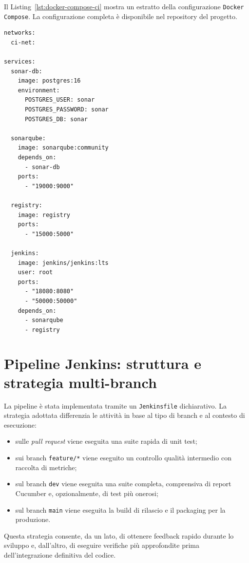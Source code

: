 Il Listing~\ref{lst:docker-compose-ci} mostra un estratto della configurazione \texttt{Docker Compose}. La configurazione completa è disponibile nel repository del progetto.

\captionsetup{type=listing}
\label{lst:docker-compose-ci}
\begin{verbatim}
networks:
  ci-net:

services:
  sonar-db:
    image: postgres:16
    environment:
      POSTGRES_USER: sonar
      POSTGRES_PASSWORD: sonar
      POSTGRES_DB: sonar

  sonarqube:
    image: sonarqube:community
    depends_on:
      - sonar-db
    ports:
      - "19000:9000"

  registry:
    image: registry
    ports:
      - "15000:5000"

  jenkins:
    image: jenkins/jenkins:lts
    user: root
    ports:
      - "18080:8080"
      - "50000:50000"
    depends_on:
      - sonarqube
      - registry
\end{verbatim}

\section{Pipeline Jenkins: struttura e strategia multi-branch}
\label{sec:pipeline-jenkins}

La pipeline è stata implementata tramite un \texttt{Jenkinsfile} dichiarativo. La strategia adottata differenzia le attività in base al tipo di branch e al contesto di esecuzione:

\begin{itemize}
	\item sulle \emph{pull request} viene eseguita una suite rapida di unit test;
	\item sui branch \texttt{feature/*} viene eseguito un controllo qualità intermedio con raccolta di metriche;
	\item sul branch \texttt{dev} viene eseguita una suite completa, comprensiva di report Cucumber e, opzionalmente, di test più onerosi;
	\item sul branch \texttt{main} viene eseguita la build di rilascio e il packaging per la produzione.
\end{itemize}

Questa strategia consente, da un lato, di ottenere feedback rapido durante lo sviluppo e, dall’altro, di eseguire verifiche più approfondite prima dell’integrazione definitiva del codice.

